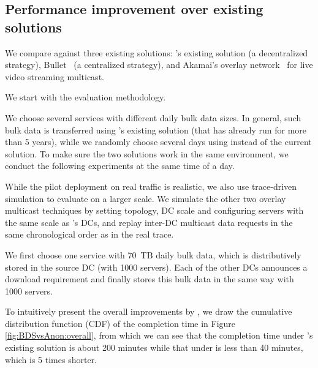 \subsection{Performance improvement over existing solutions}
\label{subsec:evaluation:centralized}

We compare \name against three existing solutions:
\company's existing solution (a decentralized strategy),
Bullet~\cite{kostic2003bullet} (a centralized strategy), and
Akamai's overlay network~\cite{Andreev2013Designing} for live video streaming
multicast.


We start with the evaluation methodology.

 We choose several services with different daily bulk data sizes. In general, such bulk data is transferred using \company's existing solution (that has already run for more than 5 years), while we randomly choose several days using \name instead of the current solution. To make sure the two solutions work in the same environment, we conduct the following experiments at the same time of a day.

 While the pilot deployment on real traffic is realistic, we also use trace-driven simulation to evaluate \name on a larger scale.
We simulate the other two overlay multicast techniques by setting topology, DC scale and configuring servers with the same scale as \name's DCs, and replay inter-DC multicast data requests in the same chronological
order as in the real trace.




We first choose one service with 70~TB daily bulk data, which is distributively stored in the source DC (with 1000 servers). Each of the other DCs announces a download requirement and finally stores this bulk data in the same way with 1000 servers.


To intuitively present the overall improvements by \name, we draw the cumulative distribution function (CDF) of the completion time in Figure \ref{fig:BDSvsAnon:overall}, from which we can see that the completion time under \company's existing solution is about 200 minutes while that under \name is less than 40 minutes, which is 5 times shorter.

